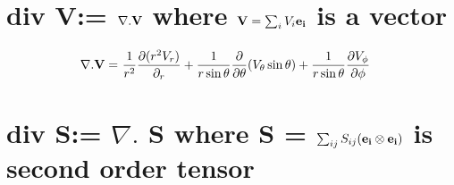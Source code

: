 \documentclass[11pt]{article}
\begin{document}


\section{div {\bf{V}}:= ${\bf{\nabla} . V}$ where ${\bf{V}} = \sum_i V_i {\bf{{e_i}}}$ is a vector}


\begin{align}
{\bf{\nabla} . V} = & \ \frac{1}{r^2} \frac{\partial (r^2 V_r) }{\partial_r} + \frac{1}{r \sin{\theta}}\frac{\partial}{\partial \theta}(V_\theta \sin{\theta}) + \frac{1}{r \sin{\theta}} \frac{\partial V_\phi}{\partial \phi}
\end{align}


\section{div {\bf{S}}:= $\nabla .$ {\bf{S}} where {\bf{S}} = $\sum_{ij} S_{ij} ({\bf{e_i}} \otimes {\bf{e_i}})$ is second order tensor}


\end{document}
